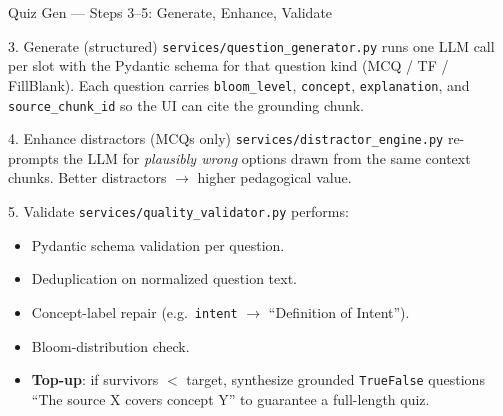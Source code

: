 \documentclass[aspectratio=169, 10pt]{beamer}
\begin{document}
\begin{frame}{Quiz Gen --- Steps 3--5: Generate, Enhance, Validate}
  \scriptsize
  \begin{block}{3. Generate (structured)}
    \texttt{services/question\_generator.py} runs one LLM call per slot
    with the Pydantic schema for that question kind (MCQ / TF / FillBlank).
    Each question carries \texttt{bloom\_level}, \texttt{concept},
    \texttt{explanation}, and \texttt{source\_chunk\_id} so the UI can
    cite the grounding chunk.
  \end{block}

  \begin{block}{4. Enhance distractors (MCQs only)}
    \texttt{services/distractor\_engine.py} re-prompts the LLM for
    \textit{plausibly wrong} options drawn from the same context
    chunks. Better distractors $\to$ higher pedagogical value.
  \end{block}

  \begin{block}{5. Validate}
    \texttt{services/quality\_validator.py} performs:
    \begin{itemize}
      \setlength\itemsep{0pt}
      \item Pydantic schema validation per question.
      \item Deduplication on normalized question text.
      \item Concept-label repair (e.g.\ \texttt{intent} $\to$
            ``Definition of Intent'').
      \item Bloom-distribution check.
      \item \textbf{Top-up}: if survivors $<$ target, synthesize
            grounded \texttt{TrueFalse} questions ``The source X covers
            concept Y'' to guarantee a full-length quiz.
    \end{itemize}
  \end{block}
\end{frame}
\end{document}
